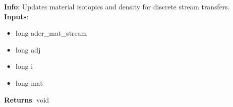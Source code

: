 \textbf{Info}: Updates material isotopics and density for discrete stream
transfers. \\

\noindent \textbf{Inputs}:
\begin{itemize}
\item{long ader\_mat\_stream}
\item{long adj}
\item{long i}
\item{long mat}
\end{itemize}

\noindent \textbf{Returns}: void
